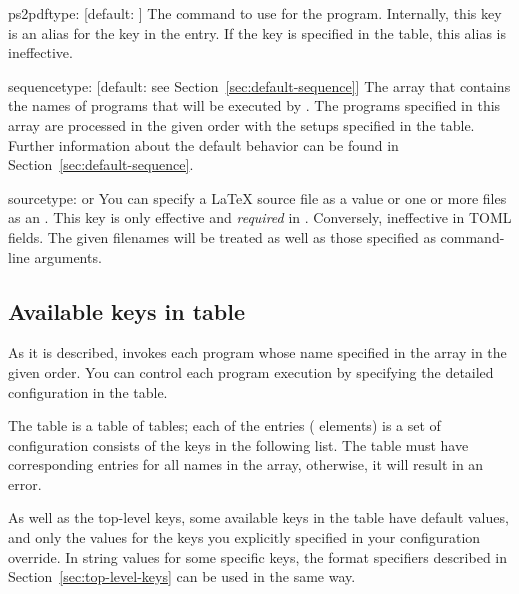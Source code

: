 \documentclass[draft]{llmk-doc}
\begin{document}
\begin{confkey}{ps2pdf}{type: }[default: ]
The command to use for the  program. Internally, this key is
an alias for the  key in the  entry. If the
 key is specified in the  table, this alias is
ineffective.
\end{confkey}

\begin{confkey}{sequence}{type: }
  [default: see Section~\ref{sec:default-sequence}]
The array that contains the names of programs that will be executed by
. The programs specified in this array are processed in the given
order with the setups specified in the  table. Further
information about the default behavior can be found in
Section~\ref{sec:default-sequence}.
\end{confkey}

\begin{confkey}{source}{type:  or }
You can specify a {\LaTeX} source file as a  value or one or more
files as an . This key is only effective and
\emph{required} in . Conversely, ineffective in TOML fields.
The given filenames will be treated as well as those specified as command-line
arguments.
\end{confkey}

\subsection{Available keys in  table}
\label{sec:keys-in-programs}

As it is described,  invokes each program whose name specified in
the  array in the given order. You can control each program
execution by specifying the detailed configuration in the 
table.

The  table is a table of tables; each of the entries (\aka
elements) is a set of configuration consists of the keys in the following list.
The  table must have corresponding entries for all names in the
 array, otherwise, it will result in an error.

As well as the top-level keys, some available keys in the  table
have default values, and only the values for the keys you explicitly specified
in your configuration override. In string values for some specific keys, the
format specifiers described in Section~\ref{sec:top-level-keys} can be used in
the same way.
\end{document}
